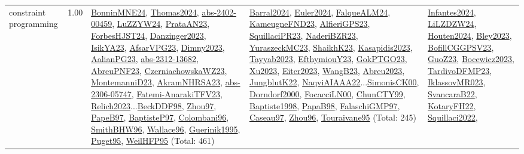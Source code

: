 {\begin{longtable}{p{3cm}r>{\raggedright\arraybackslash}p{6cm}>{\raggedright\arraybackslash}p{6cm}>{\raggedright\arraybackslash}p{8cm}}
\index{constraint programming}\index{CP!constraint programming}constraint programming &  1.00 & \hyperref[detail:BonninMNE24]{BonninMNE24}, \hyperref[detail:Thomas2024]{Thomas2024}, \hyperref[detail:abs-2402-00459]{abs-2402-00459}, \hyperref[detail:LuZZYW24]{LuZZYW24}, \hyperref[detail:PrataAN23]{PrataAN23}, \hyperref[detail:ForbesHJST24]{ForbesHJST24}, \hyperref[detail:Danzinger2023]{Danzinger2023}, \hyperref[detail:IsikYA23]{IsikYA23}, \hyperref[detail:AfsarVPG23]{AfsarVPG23}, \hyperref[detail:Dimny2023]{Dimny2023}, \hyperref[detail:AalianPG23]{AalianPG23}, \hyperref[detail:abs-2312-13682]{abs-2312-13682}, \hyperref[detail:AbreuPNF23]{AbreuPNF23}, \hyperref[detail:CzerniachowskaWZ23]{CzerniachowskaWZ23}, \hyperref[detail:MontemanniD23]{MontemanniD23}, \hyperref[detail:AkramNHRSA23]{AkramNHRSA23}, \hyperref[detail:abs-2306-05747]{abs-2306-05747}, \hyperref[detail:Fatemi-AnarakiTFV23]{Fatemi-AnarakiTFV23}, \hyperref[detail:Relich2023]{Relich2023}...\hyperref[detail:BeckDDF98]{BeckDDF98}, \hyperref[detail:Zhou97]{Zhou97}, \hyperref[detail:PapeB97]{PapeB97}, \hyperref[detail:BaptisteP97]{BaptisteP97}, \hyperref[detail:Colombani96]{Colombani96}, \hyperref[detail:SmithBHW96]{SmithBHW96}, \hyperref[detail:Wallace96]{Wallace96}, \hyperref[detail:Guerinik1995]{Guerinik1995}, \hyperref[detail:Puget95]{Puget95}, \hyperref[detail:WeilHFP95]{WeilHFP95} (Total: 461) & \hyperref[detail:Barral2024]{Barral2024}, \hyperref[detail:Euler2024]{Euler2024}, \hyperref[detail:FalqueALM24]{FalqueALM24}, \hyperref[detail:KameugneFND23]{KameugneFND23}, \hyperref[detail:AlfieriGPS23]{AlfieriGPS23}, \hyperref[detail:SquillaciPR23]{SquillaciPR23}, \hyperref[detail:NaderiBZR23]{NaderiBZR23}, \hyperref[detail:YuraszeckMC23]{YuraszeckMC23}, \hyperref[detail:ShaikhK23]{ShaikhK23}, \hyperref[detail:Kasapidis2023]{Kasapidis2023}, \hyperref[detail:Tayyab2023]{Tayyab2023}, \hyperref[detail:EfthymiouY23]{EfthymiouY23}, \hyperref[detail:GokPTGO23]{GokPTGO23}, \hyperref[detail:Xu2023]{Xu2023}, \hyperref[detail:Eiter2023]{Eiter2023}, \hyperref[detail:WangB23]{WangB23}, \hyperref[detail:Abreu2023]{Abreu2023}, \hyperref[detail:JungblutK22]{JungblutK22}, \hyperref[detail:NaqviAIAAA22]{NaqviAIAAA22}...\hyperref[detail:SimonisCK00]{SimonisCK00}, \hyperref[detail:Dorndorf2000]{Dorndorf2000}, \hyperref[detail:FocacciLN00]{FocacciLN00}, \hyperref[detail:ChunCTY99]{ChunCTY99}, \hyperref[detail:Baptiste1998]{Baptiste1998}, \hyperref[detail:PapaB98]{PapaB98}, \hyperref[detail:FalaschiGMP97]{FalaschiGMP97}, \hyperref[detail:Caseau97]{Caseau97}, \hyperref[detail:Zhou96]{Zhou96}, \hyperref[detail:Touraivane95]{Touraivane95} (Total: 245) & \hyperref[detail:Infantes2024]{Infantes2024}, \hyperref[detail:LiLZDZW24]{LiLZDZW24}, \hyperref[detail:Houten2024]{Houten2024}, \hyperref[detail:Bley2023]{Bley2023}, \hyperref[detail:BofillCGGPSV23]{BofillCGGPSV23}, \hyperref[detail:GuoZ23]{GuoZ23}, \hyperref[detail:Bocewicz2023]{Bocewicz2023}, \hyperref[detail:TardivoDFMP23]{TardivoDFMP23}, \hyperref[detail:IklassovMR023]{IklassovMR023}, \hyperref[detail:SvancaraB22]{SvancaraB22}, \hyperref[detail:KotaryFH22]{KotaryFH22}, \hyperref[detail:Squillaci2022]{Squillaci2022}, 
\end{longtable}}
